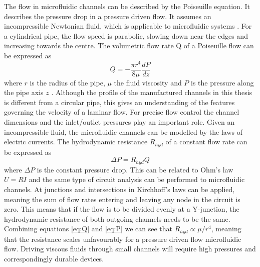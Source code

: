 \documentclass[final]{jyflluk}
\begin{document}
The flow in microfluidic channels can be described by the Poiseuille equation. It describes the pressure drop in a pressure driven flow. It assumes an incompressible Newtonian fluid, which is applicable to microfluidic systems \cite{borovsky}. For a cylindrical pipe, the flow speed is parabolic, slowing down near the edges and increasing towards the centre. The volumetric flow rate Q of a Poiseuille flow can be expressed as
%
\begin{equation}
    \label{eq:Q}
    Q = -\frac{\pi r^4}{8 \mu} \frac{dP}{dz}
 \end{equation}
 where $r$ is the radius of the pipe, $\mu$ the fluid viscosity and $P$ is the pressure along the pipe axis $z$ \cite{tian2008introduction}. Although the profile of the manufactured channels in this thesis is different from a circular pipe, this gives an understanding of the features governing the velocity of a laminar flow. For precise flow control the channel dimensions and the inlet/outlet pressures play an important role. 
 Given an incompressible fluid, the microfluidic channels can be modelled by the laws of electric currents. The hydrodynamic resistance $R_{hyd}$ of a constant flow rate can be expressed as 
 \begin{equation}
     \label{eq:P}
     \Delta P = R_{hyd} Q
  \end{equation}
 where $\Delta P$ is the constant pressure drop. This can be related to Ohm’s law $U=RI$ and the same type of circuit analysis can be performed to microfluidic channels. At junctions and intersections in Kirchhoff’s laws can be applied, meaning the sum of flow rates entering and leaving any node in the circuit is zero. This means that if the flow is to be divided evenly at a Y-junction, the hydrodynamic resistance of both outgoing channels needs to be the same. \cite{bruus2008theoretical}
 Combining equations \ref{eq:Q} and \ref{eq:P} we can see that $R_{hyd} \propto \mu/r^4$, meaning that the resistance scales unfavourably for a pressure driven flow microfluidic flow. Driving viscous fluids through small channels will require high pressures and correspondingly durable devices.
 
 
\end{document}
